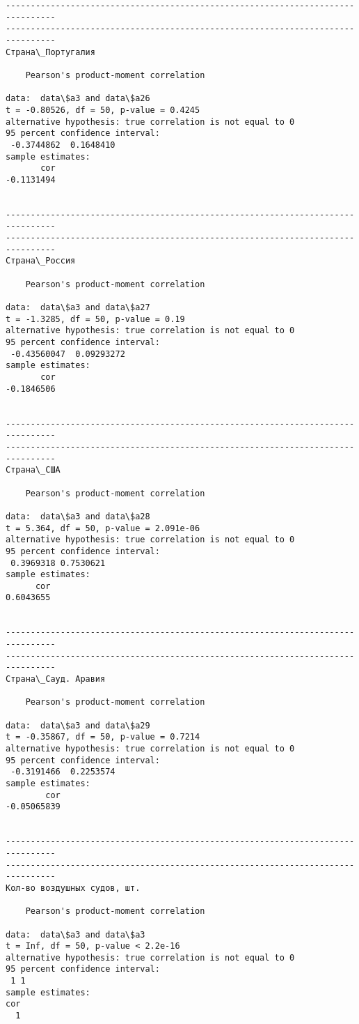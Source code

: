 \documentclass[11pt,mathletters]{article}
\begin{document}
\begin{Verbatim}[commandchars=\\\{\}]
--------------------------------------------------------------------------------
--------------------------------------------------------------------------------
Страна\_Португалия

	Pearson's product-moment correlation

data:  data\$a3 and data\$a26
t = -0.80526, df = 50, p-value = 0.4245
alternative hypothesis: true correlation is not equal to 0
95 percent confidence interval:
 -0.3744862  0.1648410
sample estimates:
       cor 
-0.1131494 


--------------------------------------------------------------------------------
--------------------------------------------------------------------------------
Страна\_Россия

	Pearson's product-moment correlation

data:  data\$a3 and data\$a27
t = -1.3285, df = 50, p-value = 0.19
alternative hypothesis: true correlation is not equal to 0
95 percent confidence interval:
 -0.43560047  0.09293272
sample estimates:
       cor 
-0.1846506 


--------------------------------------------------------------------------------
--------------------------------------------------------------------------------
Страна\_США

	Pearson's product-moment correlation

data:  data\$a3 and data\$a28
t = 5.364, df = 50, p-value = 2.091e-06
alternative hypothesis: true correlation is not equal to 0
95 percent confidence interval:
 0.3969318 0.7530621
sample estimates:
      cor 
0.6043655 


--------------------------------------------------------------------------------
--------------------------------------------------------------------------------
Страна\_Сауд. Аравия

	Pearson's product-moment correlation

data:  data\$a3 and data\$a29
t = -0.35867, df = 50, p-value = 0.7214
alternative hypothesis: true correlation is not equal to 0
95 percent confidence interval:
 -0.3191466  0.2253574
sample estimates:
        cor 
-0.05065839 


--------------------------------------------------------------------------------
--------------------------------------------------------------------------------
Кол-во воздушных судов, шт. 

	Pearson's product-moment correlation

data:  data\$a3 and data\$a3
t = Inf, df = 50, p-value < 2.2e-16
alternative hypothesis: true correlation is not equal to 0
95 percent confidence interval:
 1 1
sample estimates:
cor 
  1 



\end{Verbatim}
\end{document}
